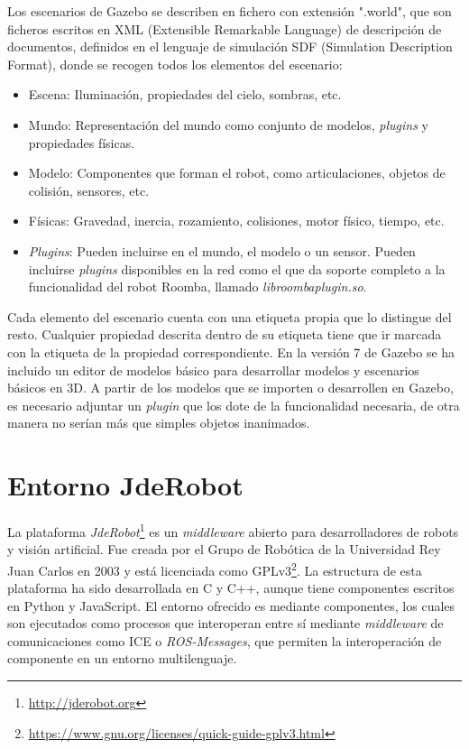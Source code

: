 Los escenarios de Gazebo se describen en fichero con extensión ".world", que son ficheros escritos en XML (Extensible Remarkable Language) de descripción de documentos, definidos en el lenguaje de simulación SDF (Simulation Description Format), donde se recogen todos los elementos del escenario:

\begin{itemize}
	\item Escena: Iluminación, propiedades del cielo, sombras, etc.
	\item Mundo: Representación del mundo como conjunto de modelos, \textit{plugins} y propiedades físicas.
	\item Modelo: Componentes que forman el robot, como articulaciones, objetos de colisión, sensores, etc.
	\item Físicas: Gravedad, inercia, rozamiento, colisiones, motor físico, tiempo, etc.
	\item \textit{Plugins}: Pueden incluirse en el mundo, el modelo o un sensor. Pueden incluirse \textit{plugins} disponibles en la red como el que da soporte completo a la funcionalidad del robot Roomba, llamado \textit{libroombaplugin.so}.
\end{itemize}

Cada elemento del escenario cuenta con una etiqueta propia que lo distingue del resto. Cualquier propiedad descrita dentro de su etiqueta tiene que ir marcada con la etiqueta de la propiedad correspondiente.
En la versión 7 de Gazebo se ha incluido un editor de modelos básico para desarrollar modelos y escenarios básicos en 3D. A partir de los modelos que se importen o desarrollen en Gazebo, es necesario adjuntar un \textit{plugin} que los dote de la funcionalidad necesaria, de otra manera no serían más que simples objetos inanimados.

\section{Entorno JdeRobot}
La plataforma \textit{JdeRobot}\footnote{\url{http://jderobot.org}} es un \textit{middleware} abierto para desarrolladores de robots y visión artificial. Fue creada por el Grupo de Robótica de la Universidad Rey Juan Carlos en 2003 y está licenciada como GPLv3\footnote{\url{https://www.gnu.org/licenses/quick-guide-gplv3.html}}.
La estructura de esta plataforma ha sido desarrollada en C y C++, aunque tiene componentes escritos en Python y JavaScript. El entorno ofrecido es mediante componentes, los cuales son ejecutados como procesos que interoperan entre sí mediante \textit{middleware} de comunicaciones como ICE o \textit{ROS-Messages}, que permiten la interoperación de componente en un entorno multilenguaje.

